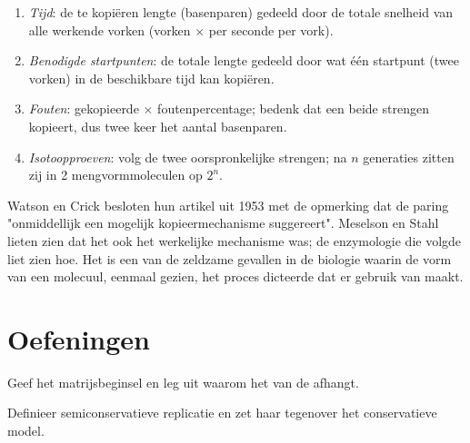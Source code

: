 \begin{method}\label{met:g11:dna-replication:calc}
\begin{enumerate}
  \item \emph{Tijd}: de te kopiëren lengte (basenparen) gedeeld door de
        totale snelheid van alle werkende vorken (vorken $\times$
         per seconde per vork).
  \item \emph{Benodigde startpunten}: de totale lengte gedeeld door wat
        één startpunt (twee vorken) in de beschikbare tijd kan kopiëren.
  \item \emph{Fouten}: gekopieerde  $\times$ foutenpercentage;
        bedenk dat een  beide strengen kopieert, dus twee keer het
        aantal basenparen.
  \item \emph{Isotoopproeven}: volg de twee oorspronkelijke strengen; na
        $n$ generaties zitten zij in 2 mengvormmoleculen op $2^n$.
\end{enumerate}
\end{method}

\begin{remark}\label{rem:g11:dna-replication:fit}
Watson en Crick besloten hun artikel uit 1953 met de opmerking dat de
paring "onmiddellijk een mogelijk kopieermechanisme suggereert". Meselson
en Stahl lieten zien dat het ook het werkelijke mechanisme was; de
enzymologie die volgde liet zien hoe. Het is een van de zeldzame gevallen
in de biologie waarin de vorm van een molecuul, eenmaal gezien, het
proces dicteerde dat er gebruik van maakt.
\end{remark}

\section{Oefeningen}

\begin{exercise}[$\star$]\label{exo:g11:dna-replication:1}
Geef het matrijsbeginsel en leg uit waarom het van de 
afhangt.
\end{exercise}

\begin{exercise}[$\star$]\label{exo:g11:dna-replication:2}
Definieer semiconservatieve replicatie en zet haar tegenover het
conservatieve model.
\end{exercise}

